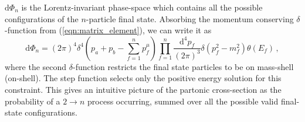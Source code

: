 \documentclass[main.tex]{subfiles}
\begin{document}
    $\mathrm{d}\Phi_{n}$ is the Lorentz-invariant
    phase-space which contains all the possible
    configurations of the $n$-particle final state.
    Absorbing the momentum conserving $\delta$-function
    from (\ref{eqn:matrix_element}),
    we can write it as
    \begin{equation}\label{eqn:dlips_4d}
        \mathrm{d}\Phi_{n} = (2\pi)^{4}\delta^{4}\left(p_{a} + p_{b} - \sum_{f=1}^{n} p_{f}^{\mu}\right) \prod_{f=1}^{n} \dfrac{\mathrm{d}^{4}p_{f}}{(2\pi)^{3}}\delta(p_{f}^{2} - m_{f}^{2})\theta(E_{f}) \, ,
    \end{equation}
    where the second $\delta$-function restricts
    the final state particles to be on mass-shell
    (on-shell). The step function selects only
    the positive energy solution for this constraint.
    This gives an intuitive picture of the partonic
    cross-section as the probability of a $2\rightarrow n$
    process occurring, summed over all the possible
    valid final-state configurations.
\end{document}
